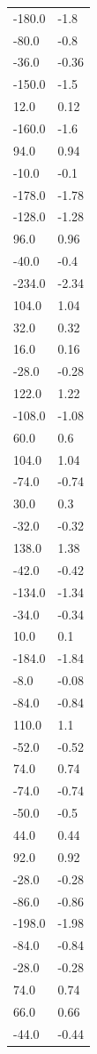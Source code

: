 \begin{longtable}{ll}
-180.0 & -1.8 \\
-80.0 & -0.8 \\
-36.0 & -0.36 \\
-150.0 & -1.5 \\
12.0 & 0.12 \\
-160.0 & -1.6 \\
94.0 & 0.94 \\
-10.0 & -0.1 \\
-178.0 & -1.78 \\
-128.0 & -1.28 \\
96.0 & 0.96 \\
-40.0 & -0.4 \\
-234.0 & -2.34 \\
104.0 & 1.04 \\
32.0 & 0.32 \\
16.0 & 0.16 \\
-28.0 & -0.28 \\
122.0 & 1.22 \\
-108.0 & -1.08 \\
60.0 & 0.6 \\
104.0 & 1.04 \\
-74.0 & -0.74 \\
30.0 & 0.3 \\
-32.0 & -0.32 \\
138.0 & 1.38 \\
-42.0 & -0.42 \\
-134.0 & -1.34 \\
-34.0 & -0.34 \\
10.0 & 0.1 \\
-184.0 & -1.84 \\
-8.0 & -0.08 \\
-84.0 & -0.84 \\
110.0 & 1.1 \\
-52.0 & -0.52 \\
74.0 & 0.74 \\
-74.0 & -0.74 \\
-50.0 & -0.5 \\
44.0 & 0.44 \\
92.0 & 0.92 \\
-28.0 & -0.28 \\
-86.0 & -0.86 \\
-198.0 & -1.98 \\
-84.0 & -0.84 \\
-28.0 & -0.28 \\
74.0 & 0.74 \\
66.0 & 0.66 \\
-44.0 & -0.44 \\

\end{longtable}
